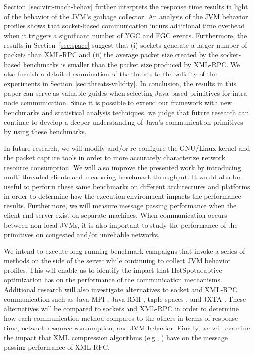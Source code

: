 \documentclass{sig-alternate}
\begin{document}
Section~\ref{sec:virt-mach-behav} further interprets the response time
results in light of the behavior of the JVM's garbage collector.  An
analysis of the JVM behavior profiles shows that socket-based
communication incurs additional time overhead when it triggers a
significant number of YGC and FGC events.  Furthermore, the results in
Section~\ref{sec:space} suggest that (i) sockets generate a larger
number of packets than XML-RPC and (ii) the average packet size
created by the socket-based benchmarks is smaller than the packet size
produced by XML-RPC.  We also furnish a detailed examination of the
threats to the validity of the experiments in
Section~\ref{sec:threats-validity}.  In conclusion, the results in
this paper can serve as valuable guides when selecting Java-based
primitives for intra-node communication.  Since it is possible to
extend our framework with new benchmarks and statistical analysis
techniques, we judge that future research can continue to develop a
deeper understanding of Java's communication primitives by using these
benchmarks.

In future research, we will modify and/or re-configure the GNU/Linux
kernel and the packet capture tools in order to more accurately
characterize network resource consumption.  We will also improve the
presented work by introducing multi-threaded clients and measuring
benchmark throughput.  It would also be useful to perform these same
benchmarks on different architectures and platforms in order to
determine how the execution environment impacts the performance
results.  Furthermore, we will measure message passing performance
when the client and server exist on separate machines.  When
communication occurs between non-local JVMs, it is also important to
study the performance of the primitives on congested and/or unreliable
networks.

We intend to execute long running benchmark campaigns that invoke a
series of methods on the side of the server while continuing to
collect JVM behavior profiles.  This will enable us to identify the
impact that HotSpot\texttrademark adaptive optimization has on the
performance of the communication mechanisms.  Additional research will
also investigate alternatives to socket and XML-RPC communication such
as Java-MPI \cite{getov-mpi,judd-mpi-java}, Java RMI
\cite{grosso-rmi,maasen-java-rmi}, tuple spaces
\cite{arnold-javaspace-rdb,fiedler-settle-sigmetrics-per,wells-linda-java-journal},
and JXTA \cite{oaks-jxta,seigneur-jxta}.  These alternatives will be
compared to sockets and XML-RPC in order to determine how each
communication method compares to the others in terms of response time,
network resource consumption, and JVM behavior. Finally, we will
examine the impact that XML compression algorithms (e.g.,
\cite{min-xpress}) have on the message passing performance of XML-RPC.
\end{document}

